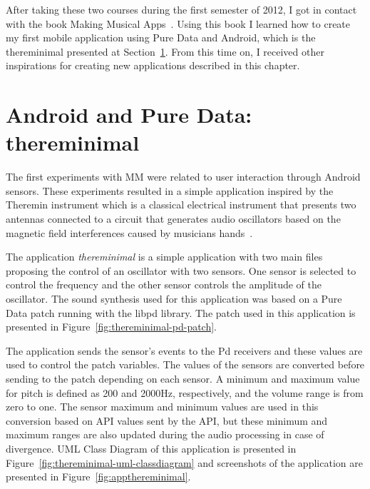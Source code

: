After taking these two courses during the first semester of 2012, I got in contact with the book Making Musical Apps~\citep{Brinkmann2012makingmusicalapps}.
Using this book I learned how to create my first mobile application using Pure Data and Android, which is the thereminimal presented at Section~\ref{sec:appthereminimal}.
From this time on, I received other inspirations for creating new applications described in this chapter.

\section{Android and Pure Data: thereminimal}
\label{sec:appthereminimal}

The first experiments with MM were related to user interaction through Android sensors.
These experiments resulted in a simple application inspired by the Theremin instrument which is a classical electrical instrument that presents two antennas connected to a circuit that generates audio oscillators based on the magnetic field interferences caused by musicians hands~\citep{Glinsky1992Theremin}.

The application \textit{thereminimal} is a simple application with two main files proposing the control of an oscillator with two sensors.
One sensor is selected to control the frequency and the other sensor controls the amplitude of the oscillator.
The sound synthesis used for this application was based on a Pure Data patch running with the libpd library.
The patch used in this application is presented in Figure~\ref{fig:thereminimal-pd-patch}.

The application sends the sensor's events to the Pd receivers and these values are used to control the patch variables.
The values of the sensors are converted before sending to the patch depending on each sensor.
A minimum and maximum value for pitch is defined as 200 and 2000Hz, respectively, and the volume range is from zero to one.
The sensor maximum and minimum values are used in this conversion based on API values sent by the API, but these minimum and maximum ranges are also updated during the audio processing in case of divergence. %
UML Class Diagram of this application is presented in Figure~\ref{fig:thereminimal-uml-classdiagram} and screenshots of the application are presented in Figure~\ref{fig:appthereminimal}.

